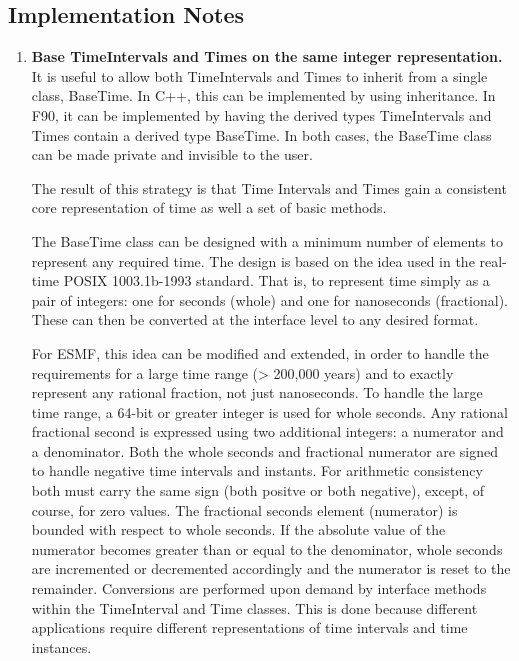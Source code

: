 
\subsection{Implementation Notes}
\begin{enumerate}

\item {\bf Base TimeIntervals and Times on the same integer representation.} 
It is useful to allow both TimeIntervals and Times to 
inherit from a single class, BaseTime.  In C++, this can be
implemented by using inheritance.  In F90, it can be implemented
by having the derived types TimeIntervals and Times
contain a derived type BaseTime.  In both cases, the 
BaseTime class can be made private and invisible to the user.

The result of this strategy is that Time Intervals and 
Times gain a consistent core representation of time as well a set
of basic methods.

The BaseTime class can be designed with a minimum number of elements
to represent any required time.  The design is based on the idea used
in the real-time POSIX 1003.1b-1993 standard.  That is, to represent
time simply as a pair of integers: one for seconds (whole) and one for
nanoseconds (fractional).  These can then be converted at the interface
level to any desired format.

For ESMF, this idea can be modified and extended, in order to handle the
requirements for a large time range (> 200,000 years) and to exactly
represent any rational fraction, not just nanoseconds.  To handle the
large time range, a 64-bit or greater integer is used for whole seconds.
Any rational fractional second is expressed using two additional integers:
a numerator and a denominator.  Both the whole seconds and fractional
numerator are signed to handle negative time intervals and instants.
For arithmetic consistency both must carry the same sign (both positve
or both negative), except, of course, for zero values.  The fractional
seconds element (numerator) is bounded with respect to whole seconds. 
If the absolute value of the
numerator becomes greater than or equal to the denominator, whole
seconds are incremented or decremented accordingly and the numerator is
reset to the remainder.  Conversions are performed upon demand by
interface methods within the TimeInterval and
Time classes.  This is done because different applications require different
representations of time intervals and time instances.


\end{enumerate}
